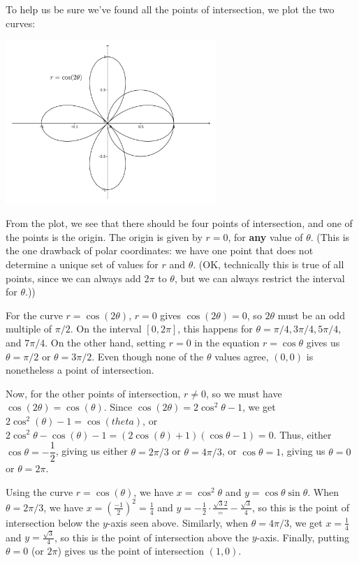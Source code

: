 \documentclass[12pt]{article}
\begin{document}
\begin{enumerate}
\begin{enumerate}
To help us be sure we've found all the points of intersection, we plot the two curves:

\begin{center}
 \includegraphics[width=0.6\textwidth]{WS6-3a}
\end{center}

From the plot, we see that there should be four points of intersection, and one of the points is the origin. The origin is given by $r=0$, for \textbf{any} value of $\theta$. (This is the one drawback of polar coordinates: we have one point that does not determine a unique set of values for $r$ and $\theta$. (OK, technically this is true of all points, since we can always add $2\pi$ to $\theta$, but we can always restrict the interval for $\theta$.))

For the curve $r=\cos(2\theta)$, $r=0$ gives $\cos(2\theta)=0$, so $2\theta$ must be an odd multiple of $\pi/2$. On the interval $[0,2\pi]$, this happens for $\theta = \pi/4, 3\pi/4, 5\pi/4$, and $7\pi/4$. On the other hand, setting $r=0$ in the equation $r=\cos\theta$ gives us $\theta = \pi/2$ or $\theta = 3\pi/2$. Even though none of the $\theta$ values agree, $(0,0)$ is nonetheless a point of intersection.

Now, for the other points of intersection, $r\neq 0$, so we must have $\cos(2\theta)=\cos(\theta)$. Since $\cos(2\theta) = 2\cos^2\theta-1$, we get $2\cos^2(\theta)-1=\cos(theta)$, or $2\cos^2\theta-\cos(\theta)-1 = (2\cos(\theta)+1)(\cos\theta-1)=0$. Thus, either $\cos\theta = -\dfrac{1}{2}$, giving us either $\theta = 2\pi/3$ or $\theta = 4\pi/3$, or $\cos\theta = 1$, giving us $\theta=0$ or $\theta = 2\pi$.

Using the curve $r=\cos(\theta)$, we have $x=\cos^2\theta$ and $y=\cos\theta\sin\theta$. When $\theta = 2\pi/3$, we have $x=\left(\frac{-1}{2}\right)^2 = \frac{1}{4}$ and $y = -\frac{1}{2}\cdot \frac{\sqrt{3}{2}} = -\frac{\sqrt{3}}{4}$, so this is the point of intersection below the $y$-axis seen above. Similarly, when $\theta = 4\pi/3$, we get $x=\frac{1}{4}$ and $y = \frac{\sqrt{3}}{4}$, so this is the point of intersection above the $y$-axis. Finally, putting $\theta=0$ (or $2\pi$) gives us the point of intersection $(1,0)$.


\end{enumerate}
\end{enumerate}
\end{document}
